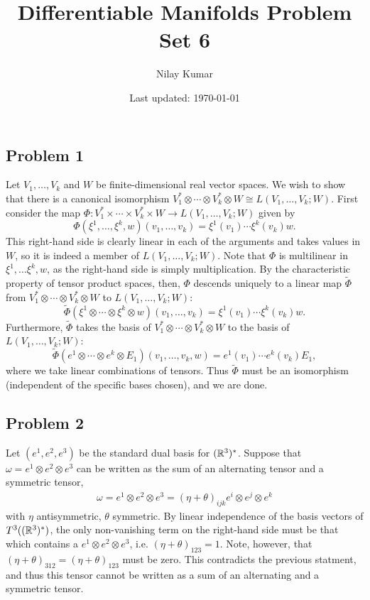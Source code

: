 \documentclass{../../mathnotes}
\title{Differentiable Manifolds Problem Set 6}
\author{Nilay Kumar}
\date{Last updated: \today}
\begin{document}
\maketitle

\subsection*{Problem 1}

Let $V_1,\ldots, V_k$ and $W$ be finite-dimensional real vector spaces. We wish to show that there is a canonical isomorphism
$V_1^* \otimes \cdots \otimes V_k^*\otimes W\cong L(V_1,\ldots,V_k;W)$. First consider the map
$\Phi:V_1^*\times \cdots \times V_k^*\times W\to L(V_1,\ldots,V_k;W)$ given by
\[\Phi(\xi^1,\ldots,\xi^k,w)(v_1,\ldots,v_k)=\xi^1(v_1)\cdots\xi^k(v_k)w.\]
This right-hand side is clearly linear in each of the arguments and takes values in $W$, so it is indeed a member of
$L(V_1,\ldots,V_k;W)$. Note that $\Phi$ is multilinear in $\xi^1,\ldots\xi^k,w$, as the right-hand side is simply
multiplication. By the characteristic property of tensor product spaces, then, $\Phi$ descends uniquely to a linear map
$\tilde\Phi$ from $V_1^* \otimes \cdots \otimes V_k^*\otimes W$ to $L(V_1,\ldots,V_k;W)$:
\[\tilde\Phi(\xi^1 \otimes \cdots \otimes \xi^k \otimes w)(v_1,\ldots,v_k)=\xi^1(v_1)\cdots\xi^k(v_k)w.\]
Furthermore, $\tilde\Phi$ takes the basis of $V_1^* \otimes \cdots \otimes V_k^*\otimes W$ to the
basis of $L(V_1,\ldots,V_k;W)$:
\[\tilde\Phi(e^1\otimes\cdots\otimes e^k \otimes E_1)(v_1,\ldots,v_k,w)=e^1(v_1)\cdots e^k(v_k)E_1,\]
where we take linear combinations of tensors.
Thus $\tilde\Phi$ must be an isomorphism (independent of the specific bases chosen), and we are done.

\subsection*{Problem 2}

Let $(e^1,e^2,e^3)$ be the standard dual basis for $(\mathbb{R}^3)^*$. Suppose that $\omega=e^1\otimes e^2\otimes e^3$ can be written
as the sum of an alternating tensor and a symmetric tensor,
\begin{align*}
    \omega=e^1\otimes e^2\otimes e^3=\left(\eta+\theta\right)_{ijk}e^i\otimes e^j\otimes e^k
\end{align*}
with $\eta$ antisymmetric, $\theta$ symmetric. By linear independence of the basis vectors of $T^3( (\mathbb{R}^3)^*)$,
the only non-vanishing term on the right-hand side must be that which contains a $e^1\otimes e^2\otimes e^3$,
i.e. $(\eta+\theta)_{123}=1$. Note, however, that $(\eta+\theta)_{312}=(\eta+\theta)_{123}$ must be zero. This
contradicts the previous statment, and thus this tensor cannot be written as a sum of an alternating and a symmetric
tensor.
\end{document}
